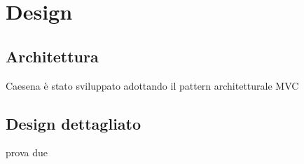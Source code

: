 \section{Design}
\subsection{Architettura}
Caesena è stato sviluppato adottando il pattern architetturale MVC 
\subsection{Design dettagliato}
prova due
